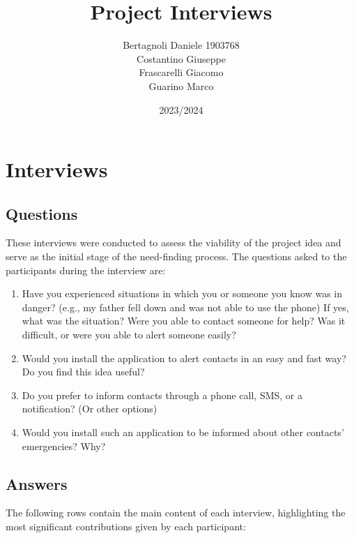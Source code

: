\documentclass[12pt]{article}
\title{Project Interviews}
\author{Bertagnoli Daniele 1903768 \\ Costantino Giuseppe \\ Frascarelli Giacomo \\ Guarino Marco}
\date{2023/2024}
\begin{document}
\maketitle

\tableofcontents
\newpage

\section{Interviews}

\subsection{Questions}
These interviews were conducted to assess the viability of the project idea and serve as the initial stage of the need-finding process. The questions asked to the participants during the interview are:
\begin{enumerate}
    \item Have you experienced situations in which you or someone you know was in danger? (e.g., my father fell down and was not able to use the phone) If yes, what was the situation? Were you able to contact someone for help? Was it difficult, or were you able to alert someone easily?
    \item Would you install the application to alert contacts in an easy and fast way? Do you find this idea useful?
    \item Do you prefer to inform contacts through a phone call, SMS, or a notification? (Or other options)
    \item Would you install such an application to be informed about other contacts' emergencies? Why?
\end{enumerate}

\subsection{Answers}
The following rows contain the main content of each interview, 
highlighting the most significant contributions given by each participant:
\end{document}
